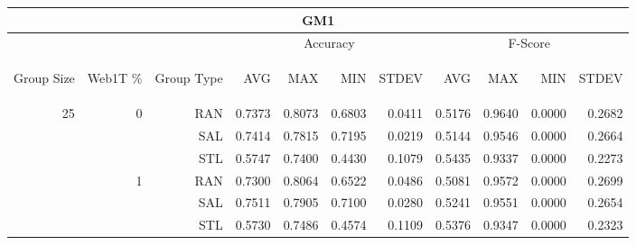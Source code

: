 \begin{center}
\begin{table}[htbp]
\begin{tabular}{ | r | r | r | r | r | r | r | r | r | r | r |}
\hline
\multicolumn{11}{|c|}{GM1}\\
\hline
 & & & \multicolumn{4}{|c|}{Accuracy} & \multicolumn{4}{|c|}{F-Score}\\ \cline{4-11}
\begin{sideways}Group Size\end{sideways} & \begin{sideways}Web1T \%\end{sideways} & \begin{sideways}Group Type\end{sideways} & \begin{sideways}AVG\end{sideways} & \begin{sideways}MAX\end{sideways} & \begin{sideways}MIN\end{sideways} & \begin{sideways}STDEV\end{sideways} & \begin{sideways}AVG\end{sideways} & \begin{sideways}MAX\end{sideways} & \begin{sideways}MIN\end{sideways} & \begin{sideways}STDEV\end{sideways}\\
\hline
\multirow{18}{*}{25}
 & \multirow{3}{*}{0} & RAN & 0.7373 & 0.8073 & 0.6803 & 0.0411 & 0.5176 & 0.9640 & 0.0000 & 0.2682\\ \cline{3-11}
 &   & SAL & 0.7414 & 0.7815 & 0.7195 & 0.0219 & 0.5144 & 0.9546 & 0.0000 & 0.2664\\ \cline{3-11}
 &   & STL & 0.5747 & 0.7400 & 0.4430 & 0.1079 & 0.5435 & 0.9337 & 0.0000 & 0.2273\\ \cline{2-11}
 & \multirow{3}{*}{1} & RAN & 0.7300 & 0.8064 & 0.6522 & 0.0486 & 0.5081 & 0.9572 & 0.0000 & 0.2699\\ \cline{3-11}
 &   & SAL & 0.7511 & 0.7905 & 0.7100 & 0.0280 & 0.5241 & 0.9551 & 0.0000 & 0.2654\\ \cline{3-11}
 &   & STL & 0.5730 & 0.7486 & 0.4574 & 0.1109 & 0.5376 & 0.9347 & 0.0000 & 0.2323\\ \cline{2-11}

\end{tabular}
\end{table}
\end{center}
